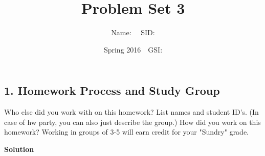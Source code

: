 \documentclass{article}
\title{Problem Set 3}
\author{Name: $\quad$SID: }
\date{Spring 2016$\quad$GSI: }
\begin{document}
\maketitle

\subsection*{1. Homework Process and Study Group}
Who else did you work with on this homework? List names and student ID's. (In case of hw party, you can also just describe the group.) How did you work on this homework? Working in groups of 3-5 will earn credit for your "Sundry" grade.
\begin{mdframed}
\textbf{Solution}

\end{mdframed}

\clearpage
\end{document}
